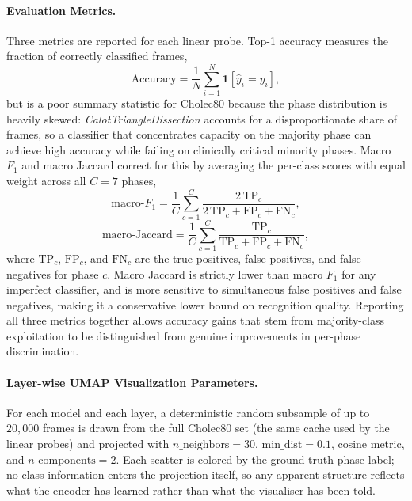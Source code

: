 \documentclass[11pt, a4paper]{article}
\begin{document}
\paragraph{Evaluation Metrics.} Three metrics are reported for each 
linear probe. Top-1 accuracy measures the fraction of correctly 
classified frames,
\begin{equation}
    \text{Accuracy} = \frac{1}{N}\sum_{i=1}^{N} \mathbf{1}[\hat{y}_i = y_i],
\end{equation}
but is a poor summary statistic for Cholec80 because the phase 
distribution is heavily skewed: \emph{CalotTriangleDissection} accounts 
for a disproportionate share of frames, so a classifier that concentrates 
capacity on the majority phase can achieve high accuracy while failing on 
clinically critical minority phases. Macro $F_1$ and macro Jaccard 
correct for this by averaging the per-class scores with equal weight 
across all $C = 7$ phases,
\begin{equation}
    \text{macro-}F_1 = \frac{1}{C}\sum_{c=1}^{C} 
    \frac{2\,\text{TP}_c}{2\,\text{TP}_c + \text{FP}_c + \text{FN}_c},
\end{equation}
\begin{equation}
    \text{macro-Jaccard} = \frac{1}{C}\sum_{c=1}^{C} 
    \frac{\text{TP}_c}{\text{TP}_c + \text{FP}_c + \text{FN}_c},
\end{equation}
where $\text{TP}_c$, $\text{FP}_c$, and $\text{FN}_c$ are the true 
positives, false positives, and false negatives for phase $c$. 
Macro Jaccard is strictly lower than macro $F_1$ for any imperfect 
classifier, and is more sensitive to simultaneous false positives and 
false negatives, making it a conservative lower bound on recognition 
quality. Reporting all three metrics together allows accuracy gains that 
stem from majority-class exploitation to be distinguished from genuine 
improvements in per-phase discrimination.

\paragraph{Layer-wise UMAP Visualization Parameters.} For each model and each layer, a deterministic random subsample of up to $20{,}000$ frames is drawn from the full Cholec80 set (the same cache used by the linear probes) and projected with $n\_\text{neighbors} = 30$, $\mathrm{min\_dist} = 0.1$, cosine metric, and $n\_\text{components} = 2$. Each scatter is colored by the ground-truth phase label; no class information enters the projection itself, so any apparent structure reflects what the encoder has learned rather than what the visualiser has been told.
\end{document}
